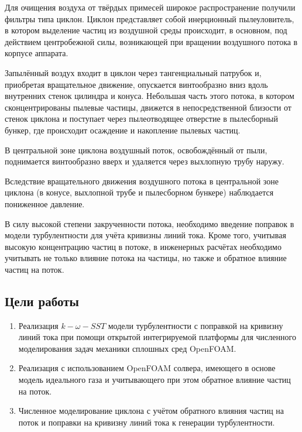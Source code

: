 		Для очищения воздуха от твёрдых примесей широкое распространение получили фильтры типа циклон. Циклон представляет собой инерционный пылеуловитель, в котором выделение частиц из воздушной среды происходит, в основном, под действием центробежной силы, возникающей при вращении воздушного потока в корпусе аппарата.
	
		Запылённый воздух входит в циклон через тангенциальный патрубок и, приобретая вращательное движение, опускается винтообразно вниз вдоль внутренних стенок цилиндра и конуса. Небольшая часть этого потока, в котором сконцентрированы пылевые частицы, движется в непосредственной близости от стенок циклона и поступает через пылеотводящее отверстие в пылесборный бункер, где происходит осаждение и накопление пылевых частиц.
	
		В центральной зоне циклона воздушный поток, освобождённый от пыли, поднимается винтообразно вверх и удаляется через выхлопную трубу наружу.
	
		Вследствие вращательного движения воздушного потока в центральной зоне циклона (в конусе, выхлопной трубе и пылесборном бункере) наблюдается пониженное давление.\cite{instructions}
	
		В силу высокой степени закрученности потока, необходимо введение поправок в модели турбулентности для учёта кривизны линий тока. Кроме того, учитывая высокую концентрацию частиц в потоке, в инженерных расчётах необходимо учитывать не только влияние потока на частицы, но также и обратное влияние частиц на поток.
	\newpage
	\subsection*{Цели работы}
		\begin{enumerate}
			\item Реализация $k-\omega-SST$ модели турбулентности с поправкой на кривизну линий тока при помощи открытой интегрируемой платформы для численного моделирования задач механики сплошных сред OpenFOAM.
			\item Реализация с использованием OpenFOAM солвера, имеющего в основе модель идеального газа и учитывающего при этом обратное влияние частиц на поток.
			\item Численное моделирование циклона с учётом обратного влияния частиц на поток и поправки на кривизну линий тока к генерации турбулентности.
		\end{enumerate}
